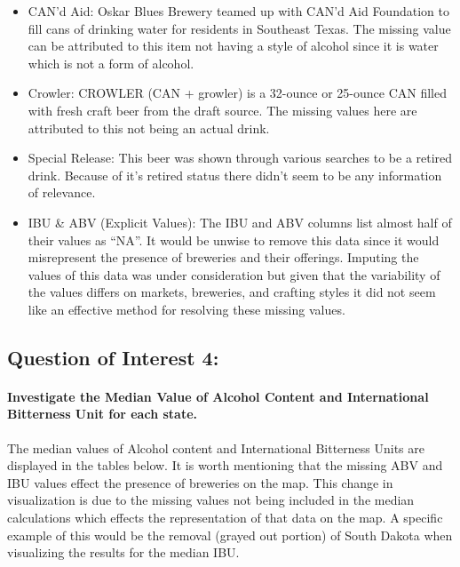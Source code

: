 \documentclass[
]{article}
\begin{document}
\begin{itemize}
\item
  CAN'd Aid: Oskar Blues Brewery teamed up with CAN'd Aid Foundation to
  fill cans of drinking water for residents in Southeast Texas. The
  missing value can be attributed to this item not having a style of
  alcohol since it is water which is not a form of alcohol.
\item
  Crowler: CROWLER (CAN + growler) is a 32-ounce or 25-ounce CAN filled
  with fresh craft beer from the draft source. The missing values here
  are attributed to this not being an actual drink.
\item
  Special Release: This beer was shown through various searches to be a
  retired drink. Because of it's retired status there didn't seem to be
  any information of relevance.
\item
  IBU \& ABV (Explicit Values): The IBU and ABV columns list almost half
  of their values as ``NA''. It would be unwise to remove this data
  since it would misrepresent the presence of breweries and their
  offerings. Imputing the values of this data was under consideration
  but given that the variability of the values differs on markets,
  breweries, and crafting styles it did not seem like an effective
  method for resolving these missing values.
\end{itemize}

\hypertarget{question-of-interest-4}{%
\subsection{Question of Interest 4:}\label{question-of-interest-4}}

\hypertarget{investigate-the-median-value-of-alcohol-content-and-international-bitterness-unit-for-each-state.}{%
\paragraph{Investigate the Median Value of Alcohol Content and
International Bitterness Unit for each
state.}\label{investigate-the-median-value-of-alcohol-content-and-international-bitterness-unit-for-each-state.}}

The median values of Alcohol content and International Bitterness Units
are displayed in the tables below. It is worth mentioning that the
missing ABV and IBU values effect the presence of breweries on the map.
This change in visualization is due to the missing values not being
included in the median calculations which effects the representation of
that data on the map. A specific example of this would be the removal
(grayed out portion) of South Dakota when visualizing the results for
the median IBU.
\end{document}

